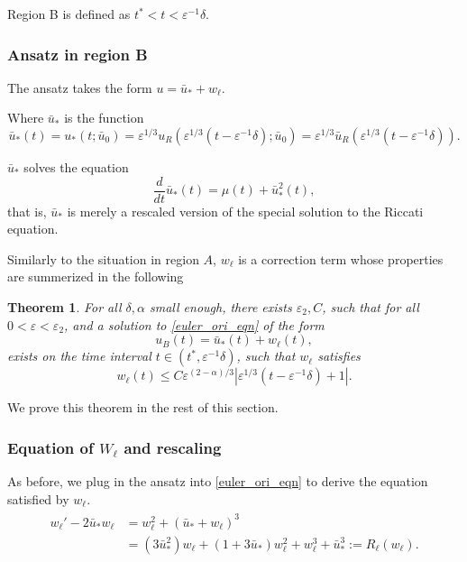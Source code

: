 \documentclass[letterpaper,11pt]{article}
\newcommand{\eps}{\varepsilon}
\numberwithin{equation}{section}
\theoremstyle{plain}
\newtheorem{theorem}{Theorem}[section]
\begin{document}
Region B is defined as $ t^*< t< \eps^{-1}\delta$.

\subsubsection{Ansatz in region B}
 The ansatz takes the form $u = \bar{u}_*  +w_\ell$.


Where $\bar{u}_*$ is the function
\begin{equation}\label{uldef}
\bar{u}_*(t) = u_*(t;\bar{u}_0) = \eps^{1/3} u_R( \eps^{1/3}(t-\eps^{-1}\delta); \bar{u}_0)=\eps^{1/3}\bar{u}_R(\eps^{1/3}(t-\eps^{-1}\delta)).
\end{equation}

$\bar{u}_*$ solves the equation
\begin{equation}\label{uleq}
\frac{d}{dt}\bar{u}_* (t) = \mu(t) + \bar{u}_*^2(t),
\end{equation}
that is, $\bar{u}_*$ is merely a rescaled version of the special solution to the Riccati equation. 

Similarly to the situation in region $A$, $w_\ell$ is a correction term whose properties are summerized in the following
\begin{theorem}\label{thm_l}
For all $\delta, \alpha$ small enough, there exists $\eps_2,C$, such that for all $0<\eps <\eps_2$, and a solution to \eqref{euler_ori_eqn} of the form
\[
u_B(t ) = \bar{u}_*(t) + w_\ell(t),
\]
exists on the time interval $t \in (t^*, \eps^{-1}\delta)$, such that $w_\ell$ satisfies
\begin{equation}\label{thm_l_1}
w_\ell(t) \le C\eps^{(2-\alpha)/3} | \eps^{1/3}(t-\eps^{-1}\delta)+1|.
\end{equation}
 
\end{theorem}

We prove this theorem in the rest of this section.
\subsubsection{Equation of \texorpdfstring{$W_{\ell}$}{Well} and rescaling}

As before, we plug in the ansatz into \eqref{euler_ori_eqn} to derive the equation satisfied by $w_\ell$.
\begin{align}\label{Eqn_wl}
\begin{split}
w_{\ell}' -2\bar{u}_* w_\ell &= w_\ell^2 + (\bar{u}_*+w_\ell)^3
 \\
 &=  (3\bar{u}_*^2)w_\ell + (1+3\bar{u}_*)w_\ell^2 + w_\ell^3+\bar{u}_*^3:=R_\ell(w_\ell).
\end{split}
\end{align}
\end{document}
